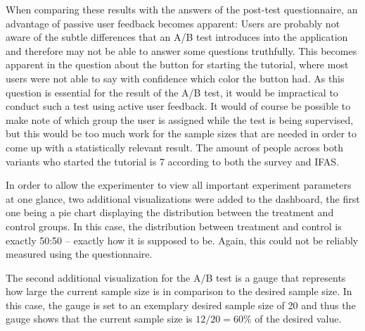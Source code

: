 When comparing these results with the answers of the post-test questionnaire, an advantage of passive user feedback becomes apparent:
Users are probably not aware of the subtle differences that an A/B test introduces into the application and therefore may not be able to answer some questions truthfully.
This becomes apparent in the question about the button for starting the tutorial, where most users were not able to say with confidence which color the button had.
As this question is essential for the result of the A/B test, it would be impractical to conduct such a test using active user feedback.
It would of course be possible to make note of which group the user is assigned while the test is being supervised, but this would be too much work for the sample sizes that are needed in order to come up with a statistically relevant result.
The amount of people across both variants who started the tutorial is 7 according to both the survey and \ac{IFAS}.

In order to allow the experimenter to view all important experiment parameters at one glance, two additional visualizations were added to the dashboard, the first one being a pie chart displaying the distribution between the treatment and control groups.
In this case, the distribution between treatment and control is exactly 50:50 -- exactly how it is supposed to be.
Again, this could not be reliably measured using the questionnaire.

The second additional visualization for the A/B test is a gauge that represents how large the current sample size is in comparison to the desired sample size.
In this case, the gauge is set to an exemplary desired sample size of 20 and thus the gauge shows that the current sample size is $12/20=60\%$ of the desired value.


%
%
%
%

